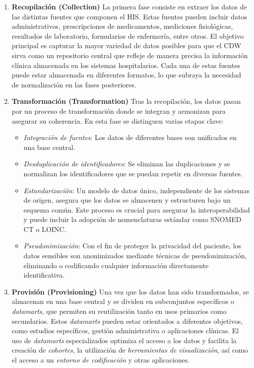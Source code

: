 \documentclass[12pt, a4paper, twoside]{article}
\begin{document}
	\begin{enumerate}
		\item \textbf{Recopilación (Collection)}  
		La primera fase consiste en extraer los datos de las distintas fuentes que componen el HIS. Estas fuentes pueden incluir datos administrativos, prescripciones de medicamentos, mediciones fisiológicas, resultados de laboratorio, formularios de enfermería, entre otros. El objetivo principal es capturar la mayor variedad de datos posibles para que el CDW sirva como un repositorio central que refleje de manera precisa la información clínica almacenada en los sistemas hospitalarios. Cada una de estas fuentes puede estar almacenada en diferentes formatos, lo que subraya la necesidad de normalización en las fases posteriores.
		
		\item \textbf{Transformación (Transformation)}  
		Tras la recopilación, los datos pasan por un proceso de transformación donde se integran y armonizan para asegurar su coherencia. En esta fase se distinguen varias etapas clave:  
		\begin{itemize}
			\item \textit{Integración de fuentes}: Los datos de diferentes bases son unificados en una base central.  
			\item \textit{Desduplicación de identificadores}: Se eliminan las duplicaciones y se normalizan los identificadores que se puedan repetir en diversas fuentes.  
			\item \textit{Estandarización}: Un modelo de datos único, independiente de los sistemas de origen, asegura que los datos se almacenen y estructuren bajo un esquema común. Este proceso es crucial para asegurar la interoperabilidad y puede incluir la adopción de nomenclaturas estándar como SNOMED CT o LOINC.  
			\item \textit{Pseudonimización}: Con el fin de proteger la privacidad del paciente, los datos sensibles son anonimizados mediante técnicas de pseudonimización, eliminando o codificando cualquier información directamente identificativa.
		\end{itemize}
		
		\item \textbf{Provisión (Provisioning)}  
		Una vez que los datos han sido transformados, se almacenan en una base central y se dividen en subconjuntos específicos o \textit{datamarts}, que permiten su reutilización tanto en usos primarios como secundarios. Estos \textit{datamarts} pueden estar orientados a diferentes objetivos, como estudios específicos, gestión administrativa o aplicaciones clínicas. El uso de \textit{datamarts} especializados optimiza el acceso a los datos y facilita la creación de \textit{cohortes}, la utilización de \textit{herramientas de visualización}, así como el acceso a un \textit{entorno de codificación} y otras aplicaciones.
		

\end{enumerate}
\end{document}
